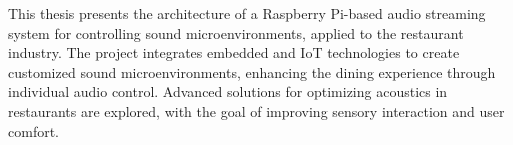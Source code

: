 
%


This thesis presents the architecture of a Raspberry Pi-based audio streaming system for controlling sound microenvironments, applied to the restaurant industry. The project integrates embedded and IoT technologies to create customized sound microenvironments, enhancing the dining experience through individual audio control. Advanced solutions for optimizing acoustics in restaurants are explored, with the goal of improving sensory interaction and user comfort.

